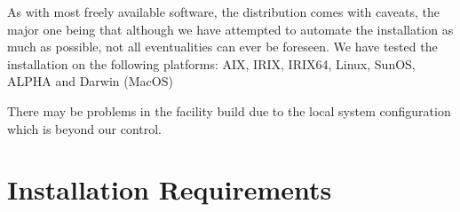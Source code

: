 \documentclass[12pt,twoside]{article}
\begin{document}
As with most freely available software, the distribution
comes with caveats, the major one being that although we have attempted
to automate the installation as much as possible, not all eventualities
can ever be foreseen. We have tested the installation on the following 
platforms: \hfill\newline
\noindent AIX, IRIX, IRIX64, Linux, SunOS, ALPHA and Darwin (MacOS) \hfill\newline

There may be problems in the facility build due to the local system 
configuration which is beyond our control. 


\section{Installation Requirements}
\label{sec:requirements}
\end{document}
